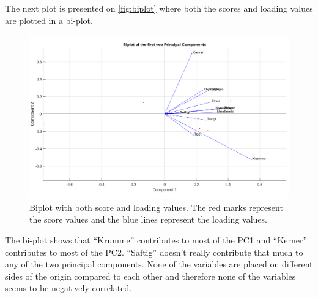 \noindent 
%
The next plot is presented on \autoref{fig:biplot} where both the scores and loading values are plotted in a bi-plot. 
%
\begin{figure}[H]
\centering
\includegraphics[width =\textwidth]{Figure/biplot}
\caption{Biplot with both score and loading values. The red marks represent the score values and the blue lines represent the loading values.}
\label{fig:biplot}
\end{figure}
\noindent
%
The bi-plot shows that ``Krumme'' contributes to most of the PC1 and ``Kerner'' contributes to most of the PC2. ``Saftig'' doesn't really contribute that much to any of the two principal components.
None of the variables are placed on different sides of the origin compared to each other and therefore none of the variables seems to be negatively correlated. \blankline

